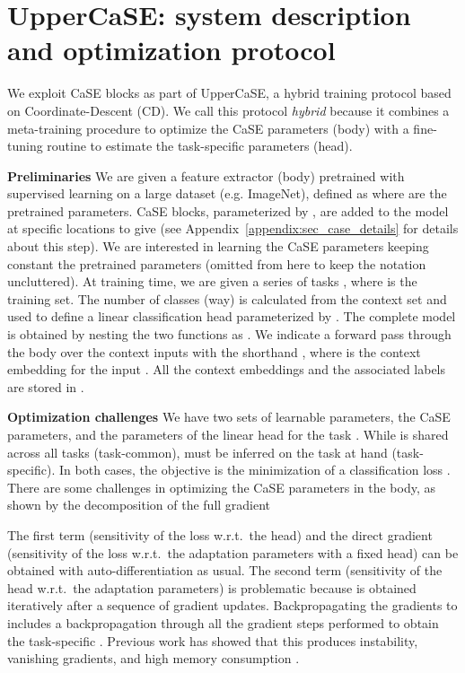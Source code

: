\documentclass{article}
\begin{document}
\section{UpperCaSE: system description and optimization protocol}

We exploit CaSE blocks as part of UpperCaSE, a hybrid training protocol based on Coordinate-Descent (CD). 
We call this protocol \emph{hybrid} because it combines a meta-training procedure to optimize the CaSE parameters (body) with a fine-tuning routine to estimate the task-specific parameters (head).

\textbf{Preliminaries} We are given a feature extractor (body) pretrained with supervised learning on a large dataset (e.g. ImageNet), defined as  where  are the pretrained parameters. CaSE blocks, parameterized by , are added to the model at specific locations to give  (see Appendix~\ref{appendix:sec_case_details} for details about this step). We are interested in learning the CaSE parameters  keeping constant the pretrained parameters  (omitted from here to keep the notation uncluttered). At training time, we are given a series of tasks , where  is the training set. The number of classes (way) is calculated from the context set and used to define a linear classification head  parameterized by . The complete model is obtained by nesting the two functions as .
We indicate a forward pass through the body over the context inputs with the shorthand , where  is the context embedding for the input . All the context embeddings and the associated labels are stored in .

\textbf{Optimization challenges} We have two sets of learnable parameters,  the CaSE parameters, and  the parameters of the linear head for the task . While  is shared across all tasks (task-common),  must be inferred on the task at hand (task-specific). In both cases, the objective is the minimization of a classification loss . There are some challenges in optimizing the CaSE parameters in the body, as shown by the decomposition of the full gradient

The first term  (sensitivity of the loss w.r.t.~the head) and the direct gradient  (sensitivity of the loss w.r.t.~the adaptation parameters with a fixed head) can be obtained with auto-differentiation as usual. The second term  (sensitivity of the head w.r.t.~the adaptation parameters) is problematic because  is obtained iteratively after a sequence of gradient updates. Backpropagating the gradients to  includes a backpropagation through all the gradient steps performed to obtain the task-specific . Previous work has showed that this produces instability, vanishing gradients, and high memory consumption \citep{antoniou2018train, rajeswaran2019meta}.
\end{document}
